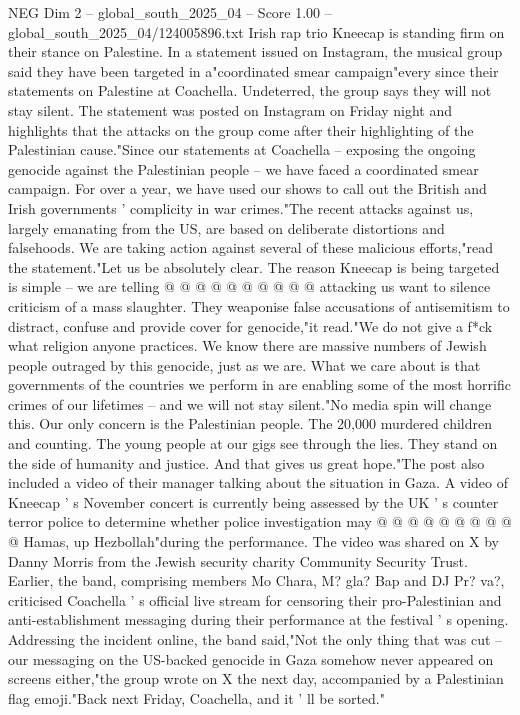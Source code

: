 \begin{textsample}{NEG Dim 2 – global\_south\_2025\_04 – Score 1.00 – global\_south\_2025\_04/124005896.txt}  \label{ex:f2_neg_178}
Irish rap trio Kneecap is standing firm on their stance on Palestine.
In a statement issued on Instagram, the musical group said they have been targeted in a"coordinated smear campaign"every since their statements on Palestine at Coachella.
Undeterred, the group says they will not stay silent.
The statement was posted on Instagram on Friday night and highlights that the attacks on the group come after their highlighting of the Palestinian cause."Since our statements at Coachella -- exposing the ongoing genocide against the Palestinian people -- we have faced a coordinated smear campaign.
For over a year, we have used our shows to call out the British and Irish governments ' complicity in war crimes."The recent attacks against us, largely emanating from the US, are based on deliberate distortions and falsehoods.
We are taking action against several of these malicious efforts,"read the statement."Let us be absolutely clear.
The reason Kneecap is being targeted is simple -- we are telling @ @ @ @ @ @ @ @ @ @ attacking us want to silence criticism of a mass slaughter.
They weaponise false accusations of antisemitism to distract, confuse and provide cover for genocide,"it read."We do not give a f*ck what religion anyone practices.
We know there are massive numbers of Jewish people outraged by this genocide, just as we are.
What we care about is that governments of the countries we perform in are enabling some of the most horrific crimes of our lifetimes -- and we will not stay silent."No media spin will change this.
Our only concern is the Palestinian people.
The 20,000 murdered children and counting.
The young people at our gigs see through the lies.
They stand on the side of humanity and justice.
And that gives us great hope."The post also included a video of their manager talking about the situation in Gaza.
A video of Kneecap ' s November concert is currently being assessed by the UK ' s counter terror police to determine whether police investigation may @ @ @ @ @ @ @ @ @ @ Hamas, up Hezbollah"during the performance.
The video was shared on X by Danny Morris from the Jewish security charity Community Security Trust.
Earlier, the band, comprising members Mo Chara, M? gla?
Bap and DJ Pr? va?, criticised Coachella ' s official live stream for censoring their pro-Palestinian and anti-establishment messaging during their performance at the festival ' s opening.
Addressing the incident online, the band said,"Not the only thing that was cut -- our messaging on the US-backed genocide in Gaza somehow never appeared on screens either,"the group wrote on X the next day, accompanied by a Palestinian flag emoji."Back next Friday, Coachella, and it ' ll be sorted."

\end{textsample}
